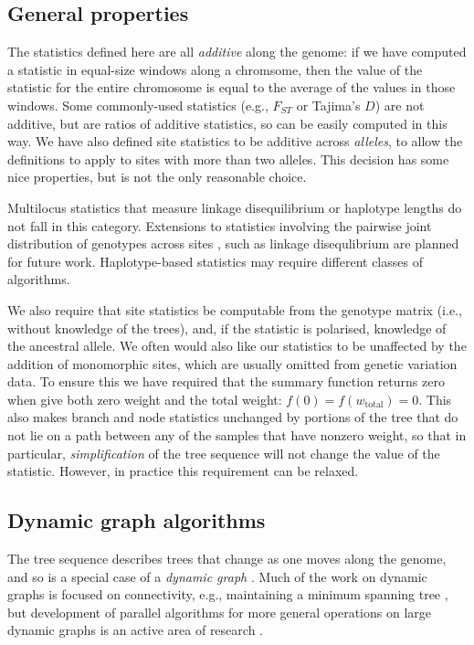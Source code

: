 \documentclass{article}
\newcommand{\tiw}{w_\text{total}} %
\begin{document}
\subsection*{General properties}

The statistics defined here are all \emph{additive} along the genome:
if we have computed a statistic in equal-size windows along a chromsome,
then the value of the statistic for the entire chromosome is equal to
the average of the values in those windows.
Some commonly-used statistics (e.g., $F_{ST}$ or Tajima's $D$)
are not additive, but are ratios of additive statistics, so can be easily computed in this way.
We have also defined site statistics to be additive across \emph{alleles},
to allow the definitions to apply to sites with more than two alleles.
This decision has some nice properties, but is not the only reasonable choice.

Multilocus statistics that measure linkage disequilibrium or haplotype lengths
do not fall in this category.
Extensions to statistics involving the pairwise joint distribution of genotypes across sites
\citep[as used by][]{hudson2001twolocus},
such as linkage disequlibrium are planned for future work.
Haplotype-based statistics may require different classes of algorithms.

We also require that site statistics be computable from the genotype matrix
(i.e., without knowledge of the trees),
and, if the statistic is polarised, knowledge of the ancestral allele.
We often would also like our statistics to be unaffected by the addition of monomorphic sites,
which are usually omitted from genetic variation data.
To ensure this we have required that the summary function returns zero when give both zero weight
and the total weight: $f(0) = f(\tiw) = 0$.
This also makes branch and node statistics unchanged by portions of the tree that do not lie on a path
between any of the samples that have nonzero weight,
so that in particular,
\emph{simplification} of the tree sequence will not change the value of the statistic.
However, in practice this requirement can be relaxed.



\subsection*{Dynamic graph algorithms}

The tree sequence describes trees that change as one moves along the genome,
and so is a special case of a \emph{dynamic graph}
\citep[also called a \emph{graph timeline}][]{lacki2013reachability}.
Much of the work on dynamic graphs is focused on connectivity,
e.g., maintaining a minimum spanning tree \citep{eppstein1994offline, eppstein1997sparsification, holm2001polylogarithmic},
but development of parallel algorithms for more general operations on large dynamic graphs
is an active area of research \citep[e.g.,][]{srinivasan2018sharedmemory}.
\end{document}
